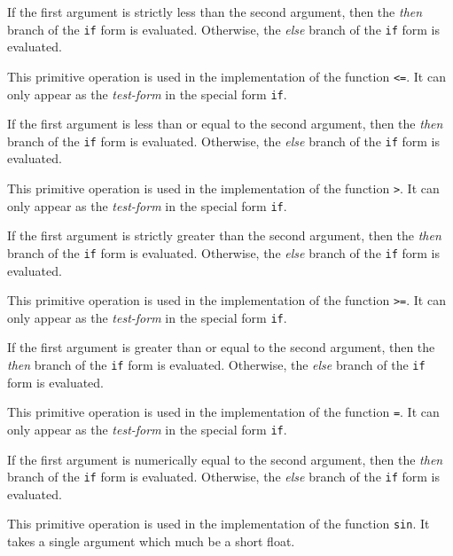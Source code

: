 If the first argument is strictly less than the second argument, then
the \emph{then} branch of the \texttt{if} form is evaluated.
Otherwise, the \emph{else} branch of the \texttt{if} form is
evaluated.

 {}

This primitive operation is used in the implementation of the
\commonlisp{} function \texttt{<=}.  \ittakesthree{}
It can only appear as the \emph{test-form} in the special form
\texttt{if}.

If the first argument is less than or equal to the second argument,
then the \emph{then} branch of the \texttt{if} form is evaluated.
Otherwise, the \emph{else} branch of the \texttt{if} form is
evaluated.

 {}

This primitive operation is used in the implementation of the
\commonlisp{} function \texttt{>}.  \ittakesthree{} It can only appear
as the \emph{test-form} in the special form \texttt{if}.

If the first argument is strictly greater than the second argument,
then the \emph{then} branch of the \texttt{if} form is evaluated.
Otherwise, the \emph{else} branch of the \texttt{if} form is
evaluated.

 {}

This primitive operation is used in the implementation of the
\commonlisp{} function \texttt{>=}.  \ittakesthree{} It can only appear
as the \emph{test-form} in the special form \texttt{if}.

If the first argument is greater than or equal to the second argument,
then the \emph{then} branch of the \texttt{if} form is evaluated.
Otherwise, the \emph{else} branch of the \texttt{if} form is
evaluated.

 {}

This primitive operation is used in the implementation of the
\commonlisp{} function \texttt{=}.  \ittakesthree{} It can only appear
as the \emph{test-form} in the special form \texttt{if}.

If the first argument is numerically equal to the second argument,
then the \emph{then} branch of the \texttt{if} form is evaluated.
Otherwise, the \emph{else} branch of the \texttt{if} form is
evaluated.

 {}

This primitive operation is used in the implementation of the
\commonlisp{} function \texttt{sin}.  It takes a single argument which
much be a short float.

